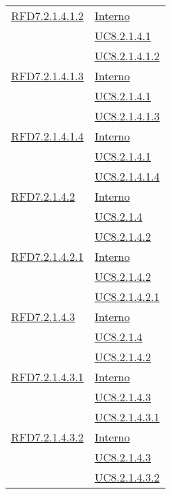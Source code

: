 \begin{longtable}{|>{\centering}m{5cm}|m{5cm}<{\centering}|}
\hyperlink{RFD7.2.1.4.1.2}{RFD7.2.1.4.1.2} & \hyperlink{Interno}{Interno}\\
& \hyperref[UC8.2.1.4.1]{UC8.2.1.4.1}\\
& \hyperref[UC8.2.1.4.1.2]{UC8.2.1.4.1.2}\\ \hline

\hyperlink{RFD7.2.1.4.1.3}{RFD7.2.1.4.1.3} & \hyperlink{Interno}{Interno}\\
& \hyperref[UC8.2.1.4.1]{UC8.2.1.4.1}\\
& \hyperref[UC8.2.1.4.1.3]{UC8.2.1.4.1.3}\\ \hline

\hyperlink{RFD7.2.1.4.1.4}{RFD7.2.1.4.1.4} & \hyperlink{Interno}{Interno}\\
& \hyperref[UC8.2.1.4.1]{UC8.2.1.4.1}\\
& \hyperref[UC8.2.1.4.1.4]{UC8.2.1.4.1.4}\\ \hline

\hyperlink{RFD7.2.1.4.2}{RFD7.2.1.4.2} & \hyperlink{Interno}{Interno}\\
& \hyperref[UC8.2.1.4]{UC8.2.1.4}\\
& \hyperref[UC8.2.1.4.2]{UC8.2.1.4.2}\\ \hline

\hyperlink{RFD7.2.1.4.2.1}{RFD7.2.1.4.2.1} & \hyperlink{Interno}{Interno}\\
& \hyperref[UC8.2.1.4.2]{UC8.2.1.4.2}\\
& \hyperref[UC8.2.1.4.2.1]{UC8.2.1.4.2.1}\\ \hline

\hyperlink{RFD7.2.1.4.3}{RFD7.2.1.4.3} & \hyperlink{Interno}{Interno}\\
& \hyperref[UC8.2.1.4]{UC8.2.1.4}\\
& \hyperref[UC8.2.1.4.2]{UC8.2.1.4.2}\\ \hline

\hyperlink{RFD7.2.1.4.3.1}{RFD7.2.1.4.3.1} & \hyperlink{Interno}{Interno}\\
& \hyperref[UC8.2.1.4.3]{UC8.2.1.4.3}\\
& \hyperref[UC8.2.1.4.3.1]{UC8.2.1.4.3.1}\\ \hline

\hyperlink{RFD7.2.1.4.3.2}{RFD7.2.1.4.3.2} & \hyperlink{Interno}{Interno}\\
& \hyperref[UC8.2.1.4.3]{UC8.2.1.4.3}\\
& \hyperref[UC8.2.1.4.3.2]{UC8.2.1.4.3.2}\\ \hline


\end{longtable}
